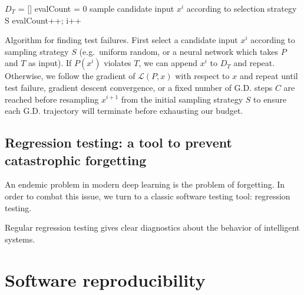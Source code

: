 \documentclass[12pt,initial,twoside,maitrise]{dms}
\numberwithin{equation}{section}
\numberwithin{table}{chapter}
\numberwithin{figure}{chapter}
\begin{document}
\begin{algorithm}

    $D_T$ = []\;
    evalCount = 0\;
     {
    sample candidate input $x^i$ according to selection strategy S\;
    evalCount++; i++\;
    }

    \caption{Algorithm for finding test failures. First select a candidate input $x^i$ according to sampling strategy $S$ (e.g.\ uniform random, or a neural network which takes $P$ and $T$ as input). If $P(x^i)$ violates $T$, we can append $x^i$ to $D_T$ and repeat. Otherwise, we follow the gradient of $\mathcal{L}(P, x)$ with respect to $x$ and repeat until test failure, gradient descent convergence, or a fixed number of G.D. steps $C$ are reached before resampling $x^{i+1}$ from the initial sampling strategy $S$ to ensure each G.D. trajectory will terminate before exhausting our budget.}
\end{algorithm}

\section{Regression testing: a tool to prevent catastrophic forgetting}

An endemic problem in modern deep learning is the problem of forgetting. In order to combat this issue, we turn to a classic software testing tool: regression testing.

Regular regression testing gives clear diagnostics about the behavior of intelligent systems.

\chapter{Software reproducibility}\label{ch:software-reproducibility}
\end{document}
